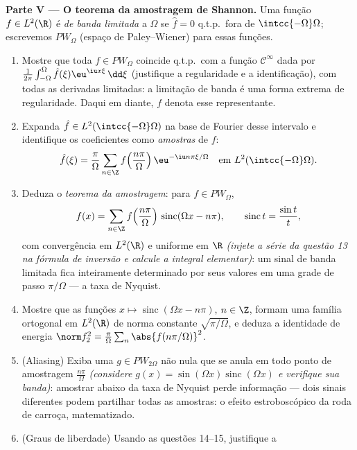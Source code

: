 \begin{problem}[{Problema de fim de semana --- $\partial_tu =
\partial^2_{xx}u$, resolvida de
ponta a ponta}]
\medskip
\noindent\textbf{Parte V --- O teorema da amostragem de Shannon.} Uma
função $f \in L^2(\R)$ é \emph{de banda limitada} a $\Omega$ se $\hat f = 0$ q.t.p.\
fora de $\intcc{-\Omega}\Omega$; escrevemos $PW_\Omega$ (espaço de Paley--Wiener) para essas
funções.
\begin{enumerate}[resume]
  \item Mostre que toda $f \in PW_\Omega$ coincide q.t.p.\ com a função $\mathcal C^\infty$ dada
        por $\frac1{2\pi}\int_{-\Omega}^{\Omega}\hat
        f(\xi)\eu^{\iu x\xi}\,\dd\xi$ (justifique a regularidade e a identificação), com
        todas as derivadas limitadas: a limitação de banda é uma forma
        extrema de regularidade. Daqui em diante, $f$ denota esse
        representante.
  \item Expanda $\hat f \in L^2(\intcc{-\Omega}\Omega)$ na base de Fourier desse intervalo e identifique
        os coeficientes como \emph{amostras} de $f$:
        \[
        \hat f(\xi) = \frac\pi\Omega\sum_{n\in\Z}
        f\Bigl(\frac{n\pi}\Omega\Bigr)\,
        \eu^{-\iu n\pi\xi/\Omega}
        \quad\text{em } L^2(\intcc{-\Omega}\Omega) .
        \]
  \item Deduza o \emph{teorema da amostragem}: para $f \in
        PW_\Omega$,
        \[
        f(x) = \sum_{n\in\Z}f\Bigl(\frac{n\pi}
        \Omega\Bigr)\,\operatorname{sinc}(\Omega x - n\pi),
        \qquad \operatorname{sinc}t = \frac{\sin t}t,
        \]
        com convergência em $L^2(\R)$ e uniforme em $\R$ \emph{(injete a
        série da questão 13 na fórmula de inversão e calcule a integral
        elementar)}: um sinal de banda limitada fica inteiramente
        determinado por seus valores em uma grade de passo $\pi/\Omega$ --- a
        taxa de Nyquist.
  \item Mostre que as funções $x \mapsto
        \operatorname{sinc}(\Omega x - n\pi)$, $n \in \Z$, formam uma família ortogonal
        em $L^2(\R)$ de norma constante $\sqrt{\pi/\Omega}$, e deduza a identidade de
        energia $\norm f_2^2 =
        \frac\pi\Omega\sum_n\abs{f(n\pi/\Omega)}^2$.
  \item (Aliasing) Exiba uma $g \in PW_{2\Omega}$ não nula que se anula em todo ponto
        de amostragem $\frac{n\pi}\Omega$ \emph{(considere $g(x) =
        \sin(\Omega x)\operatorname{sinc}(\Omega x)$ e verifique sua
        banda)}: amostrar abaixo da taxa de Nyquist perde informação
        --- dois sinais diferentes podem partilhar todas as amostras: o
        efeito estroboscópico da roda de carroça, matematizado.
  \item (Graus de liberdade) Usando as questões 14--15, justifique a

\end{enumerate}
\end{problem}
